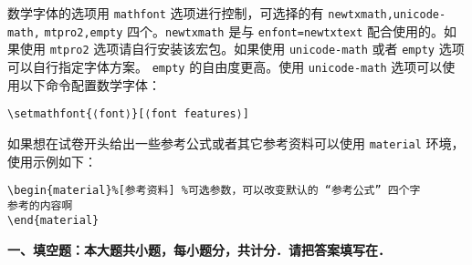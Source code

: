 \documentclass[hideanswer=false,
enfont=newtxtext,
zhfont=empty,
mathfont=newtxmath,
]{cmcthesis}
\begin{document}
数学字体的选项用 \verb|mathfont| 选项进行控制，可选择的有 \verb|newtxmath,unicode-math,| \verb|mtpro2,empty| 四个。\verb|newtxmath| 是与 \verb|enfont=newtxtext| 配合使用的。如果使用 \verb|mtpro2| 选项请自行安装该宏包。如果使用 \verb|unicode-math| 或者 \verb|empty| 选项可以自行指定字体方案。 \verb|empty| 的自由度更高。使用 \verb|unicode-math| 选项可以使用以下命令配置数学字体：
\begin{lstlisting}[style=tex]
\setmathfont{⟨font⟩}[⟨font features⟩]
\end{lstlisting}

如果想在试卷开头给出一些参考公式或者其它参考资料可以使用 \verb|material| 环境，使用示例如下：
\begin{lstlisting}[style=tex]
\begin{material}%[参考资料] %可选参数，可以改变默认的 “参考公式” 四个字
参考的内容啊
\end{material}
\end{lstlisting}
	
	{\bfseries 一、填空题：本大题共{}小题，每小题{}分，共计{}分．请把答案填写在．}
\end{document}
